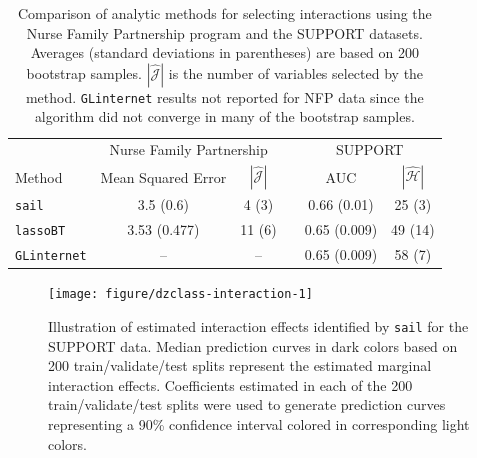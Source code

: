 \documentclass[a4paper,fleqn]{cas-sc}
\begin{document}
%
%
%





\begin{table}
	\centering
	\caption{Comparison of analytic methods for selecting interactions using the Nurse Family Partnership program and the SUPPORT datasets. Averages (standard deviations in parentheses) are based on 200 bootstrap samples. $|\widehat{\mathcal{J}}|$ is the number of variables selected by the method. \texttt{GLinternet} results not reported for NFP data since the algorithm did not converge in many of the bootstrap samples.}
	\label{tab:rda}
	\begin{tabular}{lccccc}
		\hline
	& \multicolumn{2}{c}{Nurse Family Partnership} &  &\multicolumn{2}{c}{SUPPORT} \\
\cmidrule(r){2-3} \cmidrule(l){5-6}	            
Method          &  Mean Squared Error                                                                 & $|\widehat{\mathcal{J}}|$                                                       & & AUC                                                                            & $|\widehat{\mathcal{H}}|$ \\
\hline
\texttt{sail}  &  3.5 (0.6)     &  4 (3) & & 0.66 (0.01)     &  25 (3)  \\
\texttt{lassoBT}    &  3.53 (0.477)     &  11 (6)   & &  0.65 (0.009)     &  49 (14)  \\
\texttt{GLinternet} &  	--                                                                               & --                                                                               & &  0.65 (0.009)     &  58 (7)   \\
		\hline
	\end{tabular}
\end{table}




%
%
%


\begin{figure}
	
	{\centering \texttt{[image: figure/dzclass-interaction-1]} 
		
	}
	
	\caption[Illustration of estimated interaction effects identified by \texttt{sail} for the SUPPORT data]{Illustration of estimated interaction effects identified by \texttt{sail} for the SUPPORT data. Median prediction curves in dark colors based on 200 train/validate/test splits represent the estimated marginal interaction effects. Coefficients estimated in each of the 200 train/validate/test splits were used to generate prediction curves representing a 90\% confidence interval colored in corresponding light colors.}\label{fig:dzclass-interaction}
\end{figure}
\end{document}

